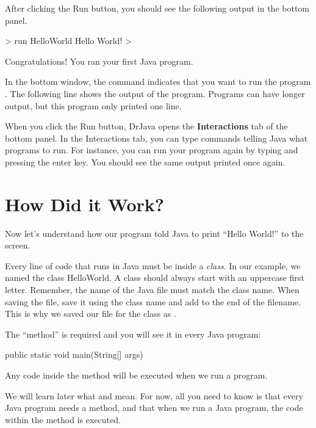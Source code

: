 After clicking the Run button, you should see the following output in the bottom panel.
\begin{code}
> run HelloWorld 
Hello World!
>
\end{code}

Congratulations! You ran your first Java program.

In the bottom window, the  command indicates that you want to run the program . The following line shows the output of the program. Programs can have longer output, but this program only printed one line.

When you click the Run button, DrJava opens the \textbf{Interactions} tab of the bottom panel. In the Interactions tab, you can type commands telling Java what programs to run. For instance, you can run your program again by typing  and pressing the enter key. You should see the same output printed once again.

\section{How Did it Work?} 

Now let's understand how our  program told Java to print ``Hello World!'' to the screen.

Every line of code that runs in Java must be inside a \emph{class}. In our example, we named the class HelloWorld. A class should always start with an uppercase first letter. Remember, the name of the Java file must match the class name. When saving the file, save it using the class name and add  to the end of the filename. This is why we saved our file for the  class as .


The  ``method'' is required and you will see it in every Java program: 

\begin{code}
public static void main(String[] args)
\end{code}

Any code inside the  method will be executed when we run a program. 

We will learn later what
 and  mean. For now, all you need to know is that every Java program needs a  method, and that when we run a Java program, the code within the  method is executed. 

